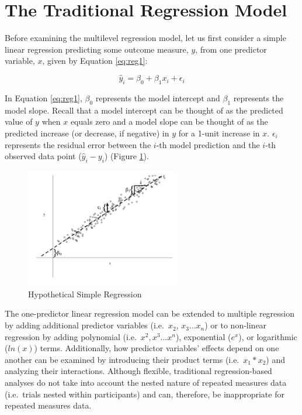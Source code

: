 \documentclass[
]{article}
\begin{document}
\hypertarget{the-traditional-regression-model}{%
\section{The Traditional Regression Model}\label{the-traditional-regression-model}}

Before examining the multilevel regression model, let us first consider a simple linear regression predicting some outcome measure, \(y\), from one predictor variable, \(x\), given by Equation \ref{eq:reg1}:

\begin{equation}
\hat{y}_{i}=\beta_{0}+\beta_{1}x_{i}+\epsilon_{i}
\label{eq:reg1}
\end{equation}

\noindent
In Equation \ref{eq:reg1}, \(\beta_{0}\) represents the model intercept and \(\beta_{1}\) represents the model slope. Recall that a model intercept can be thought of as the predicted value of \(y\) when \(x\) equals zero and a model slope can be thought of as the predicted increase (or decrease, if negative) in \(y\) for a 1-unit increase in \(x\). \(\epsilon_{i}\) represents the residual error between the \(i\)-th model prediction and the \(i\)-th observed data point (\(\hat{y}_{i}-y_{i}\)) (Figure \ref{fig1}).

\begin{figure}
\centering
\captionsetup{width=0.6\textwidth}
\includegraphics[width=0.6\textwidth]{fig1.png}
\caption{Hypothetical Simple Regression}
\label{fig1}
\end{figure}

The one-predictor linear regression model can be extended to multiple regression by adding additional predictor variables (i.e.~\(x_{2}\), \(x_{3}...x_{n}\)) or to non-linear regression by adding polynomial (i.e.~\(x^{2}, x^{3}...x^{n}\)), exponential (\(e^{x}\)), or logarithmic (\(ln(x)\)) terms. Additionally, how predictor variables' effects depend on one another can be examined by introducing their product terms (i.e.~\(x_{1}*x_{2}\)) and analyzing their interactions. Although flexible, traditional regression-based analyses do not take into account the nested nature of repeated measures data (i.e.~trials nested within participants) and can, therefore, be inappropriate for repeated measures data.
\end{document}
